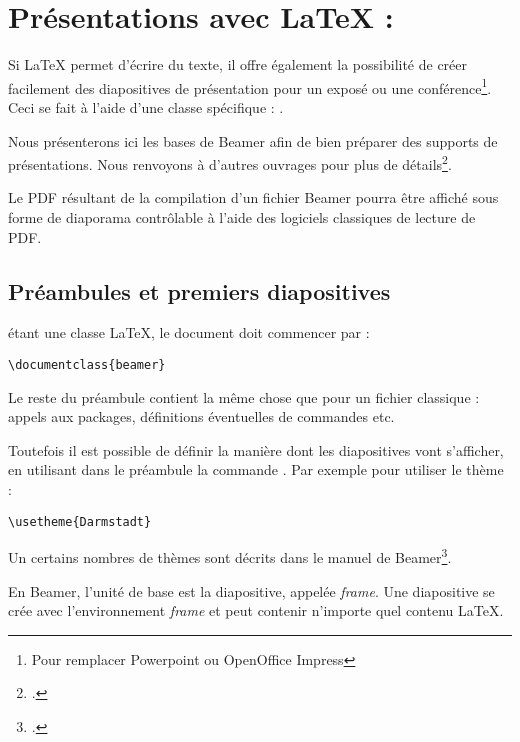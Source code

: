 \chapter{Présentations avec \LaTeX{} : }

\begin{prealable}
Si \LaTeX{} permet d'écrire du texte, il offre également la possibilité de créer facilement des diapositives de présentation pour un exposé ou une conférence\footnote{Pour remplacer Powerpoint ou OpenOffice Impress}. Ceci se fait à l'aide d'une classe spécifique : .

Nous présenterons ici les bases de Beamer afin de bien préparer des supports de présentations. Nous renvoyons à d'autres ouvrages pour plus de détails\footcites[On consultera pour une introduction plus approfondie][]{intro_beamer}[pour les usages avancées on se servira du manuel : ][]{beamer}.

Le PDF résultant de la compilation d'un fichier Beamer pourra être affiché sous forme de diaporama contrôlable à l'aide des logiciels classiques de lecture de PDF.
\end{prealable}

\section{Préambules et premiers diapositives}

 étant une classe \LaTeX{}, le document doit commencer par :

\begin{verbatim}
\documentclass{beamer}
\end{verbatim}

Le reste du préambule contient la même chose que pour un fichier  classique : appels aux packages, définitions éventuelles de commandes etc.

Toutefois il est possible de définir la manière dont les diapositives vont s'afficher, en utilisant dans le préambule la commande . Par exemple pour utiliser le thème  :

\begin{verbatim}
\usetheme{Darmstadt}
\end{verbatim}

Un certains nombres de thèmes sont décrits dans le manuel de Beamer\footcite{beamer_theme}.

En Beamer, l'unité de base  est la diapositive, appelée \textenglish{\emph{frame}}. Une diapositive se crée avec l'environnement \emph{frame} et peut contenir n'importe quel contenu \LaTeX{}.

